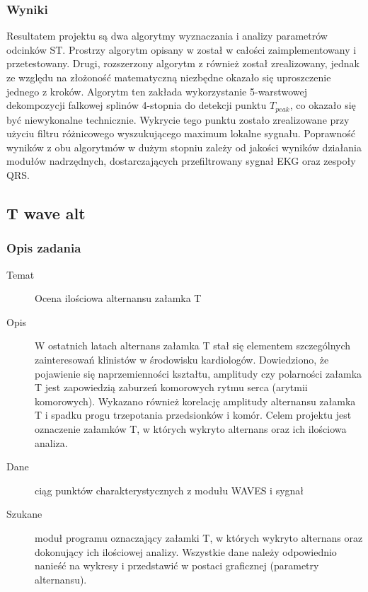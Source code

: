 \documentclass[a4paper, 11pt]{article}
\begin{document}
\subsubsection{Wyniki}
\label{sec:st_interval:results}
Resultatem projektu są dwa algorytmy wyznaczania i analizy parametrów odcinków ST. Prostrzy algorytm opisany w \cite{AUGUST1} został w całości zaimplementowany i przetestowany. Drugi, rozszerzony algorytm z \cite{SHEN1} również został zrealizowany, jednak ze względu na złożoność matematyczną niezbędne okazało się uproszczenie jednego z kroków. Algorytm ten zakłada wykorzystanie 5-warstwowej dekompozycji falkowej splinów 4-stopnia do detekcji punktu $T_{peak}$, co okazało się być niewykonalne technicznie. Wykrycie tego punktu zostało zrealizowane przy użyciu filtru różnicowego wyszukującego maximum lokalne sygnału. Poprawność wyników z obu algorytmów w dużym stopniu zależy od jakości wyników działania modułów nadrzędnych, dostarczających przefiltrowany sygnał EKG oraz zespoły QRS.


\subsection{T wave alt}
\label{sec:t_wave_alt}

\subsubsection{Opis zadania}
\label{sec::t_wave_alt:desc}

\begin{description}
\item[Temat] Ocena ilościowa alternansu załamka T
\item[Opis] W ostatnich latach alternans załamka T stał się
 elementem szczególnych zainteresowań klinistów w środowisku kardiologów.
 Dowiedziono, że pojawienie się naprzemienności kształtu, amplitudy czy
 polarności załamka T jest zapowiedzią zaburzeń komorowych rytmu serca 
(arytmii komorowych). Wykazano również korelację amplitudy alternansu 
załamka T i spadku progu trzepotania przedsionków i komór. Celem projektu
 jest oznaczenie załamków T, w których wykryto alternans oraz ich ilościowa analiza.
\item[Dane] ciąg punktów charakterystycznych z modułu WAVES i sygnał 
\item[Szukane] moduł programu oznaczający załamki T, w których wykryto alternans
 oraz dokonujący ich ilościowej analizy. Wszystkie dane należy odpowiednio nanieść
 na wykresy i przedstawić w postaci graficznej (parametry alternansu).
\end{description}
\end{document}
